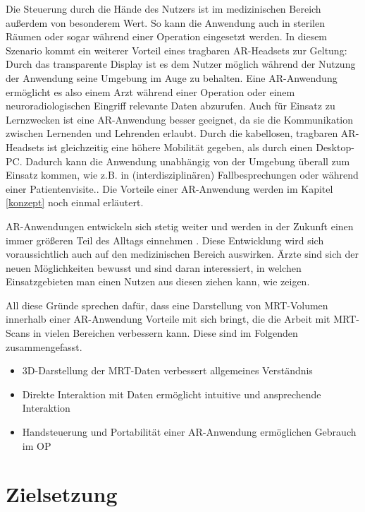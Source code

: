 Die Steuerung durch die Hände des Nutzers ist im medizinischen Bereich außerdem von besonderem Wert. So kann die Anwendung auch in sterilen Räumen oder sogar während einer Operation eingesetzt werden. In diesem Szenario kommt ein weiterer Vorteil eines tragbaren AR-Headsets zur Geltung: Durch das transparente Display ist es dem Nutzer möglich während der Nutzung der Anwendung seine Umgebung im Auge zu behalten. 
Eine AR-Anwendung ermöglicht es also einem Arzt während einer Operation oder einem neuroradiologischen Eingriff relevante Daten abzurufen.
Auch für Einsatz zu Lernzwecken ist eine AR-Anwendung besser geeignet, da sie die Kommunikation zwischen Lernenden und Lehrenden erlaubt.
Durch die kabellosen, tragbaren AR-Headsets ist gleichzeitig eine höhere Mobilität gegeben, als durch einen Desktop-PC. Dadurch kann die Anwendung unabhängig von der Umgebung überall zum Einsatz kommen, wie z.B. in (interdisziplinären) Fallbesprechungen oder während einer Patientenvisite.. 
Die Vorteile einer AR-Anwendung werden im Kapitel \ref{konzept} noch einmal erläutert.

AR-Anwendungen entwickeln sich stetig weiter und werden in der Zukunft einen immer größeren Teil des Alltags einnehmen \cite{forbes}. Diese Entwicklung wird sich voraussichtlich auch auf den medizinischen Bereich auswirken. 
Ärzte sind sich der neuen Möglichkeiten bewusst und sind daran interessiert, 
in welchen Einsatzgebieten man einen Nutzen aus diesen ziehen kann, wie \cite{holomed1} zeigen.

All diese Gründe sprechen dafür, dass eine Darstellung von MRT-Volumen innerhalb einer AR-Anwendung Vorteile mit sich bringt, die die Arbeit mit MRT-Scans in vielen Bereichen verbessern kann. Diese sind im Folgenden zusammengefasst.

\begin{itemize}
\item 3D-Darstellung der MRT-Daten verbessert allgemeines Verständnis 
\item Direkte Interaktion mit Daten ermöglicht intuitive und ansprechende Interaktion
\item Handsteuerung und Portabilität einer AR-Anwendung ermöglichen Gebrauch im OP
\end{itemize}

\section{Zielsetzung}

